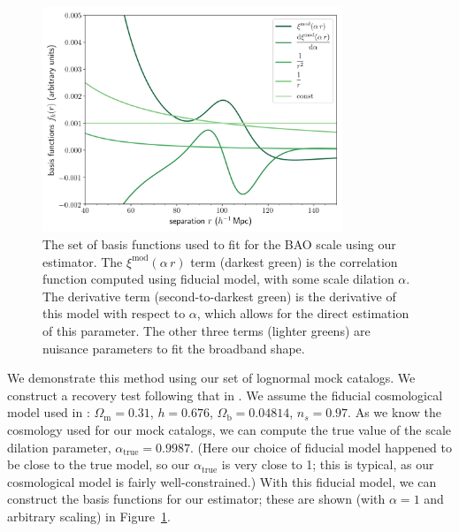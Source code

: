 \documentclass[modern]{aastex62}
\begin{document}
\begin{figure}[ht]
\centering
    \includegraphics[width=0.8\textwidth]{bao_bases}
    \caption{The set of basis functions used to fit for the BAO scale using our estimator. The $\xi^\mathrm{mod}(\alpha\,r)$ term (darkest green) is the correlation function computed using fiducial model, with some scale dilation $\alpha$. The derivative term (second-to-darkest green) is the derivative of this model with respect to $\alpha$, which allows for the direct estimation of this parameter. The other three terms (lighter greens) are nuisance parameters to fit the broadband shape.}
    \label{fig:bao_bases}
\end{figure}

We demonstrate this method using our set of lognormal mock catalogs.
We construct a recovery test following that in \cite{Hinton2019}.
We assume the fiducial cosmological model used in \cite{Beutler2017}: $\Omega_{\text{m}} = 0.31$, $h = 0.676$, $\Omega_{\text{b}} = 0.04814$, $n_s = 0.97$. 
As we know the cosmology used for our mock catalogs, we can compute the true value of the scale dilation parameter, $\alpha_{\text{true}}=0.9987$.
(Here our choice of fiducial model happened to be close to the true model, so our $\alpha_{\text{true}}$ is very close to 1; this is typical, as our cosmological model is fairly well-constrained.)
With this fiducial model, we can construct the basis functions for our estimator; these are shown (with $\alpha=1$ and arbitrary scaling) in Figure~\ref{fig:bao_bases}.
\end{document}
